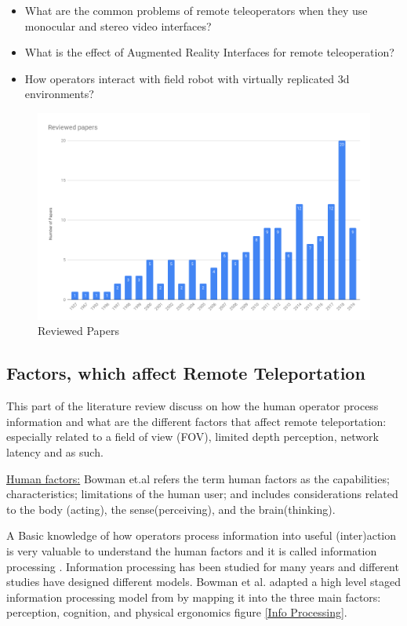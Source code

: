 \begin{itemize}
    \item What are the common problems of remote teleoperators when they use monocular and stereo video interfaces?
    \item What is the effect of Augmented Reality Interfaces for remote teleoperation?
    \item How operators interact with field robot with virtually replicated 3d environments?
\end{itemize}

\begin{figure}
     \includegraphics[scale=0.35]{images/Reviewed_papers.png}
    \caption{Reviewed Papers}
    \centering
    \label{Reviewed Papers}
\end{figure}

\subsection{Factors, which affect Remote Teleportation}

This part of the literature review discuss on how the human operator process information and what are the different factors that affect remote teleportation: especially related to a field of view (FOV), limited depth perception, network latency and as such.

\underline{Human factors:} Bowman et.al  \cite{Bowman:2004:UIT:993837} refers the term human factors as the capabilities; characteristics; limitations of the human user; and includes considerations related to the body (acting), the sense(perceiving), and the brain(thinking).

A Basic knowledge of how operators process information into useful (inter)action is very valuable to understand the human factors and it is called information processing \cite{Bowman:2004:UIT:993837}. Information processing has been studied for many years and different studies have designed different models. Bowman et al. \cite{Bowman:2004:UIT:993837} adapted a high level staged information processing model from \cite{PMID:11540969} by mapping it into the three main factors: perception, cognition, and physical ergonomics figure \ref{Info Processing}.

